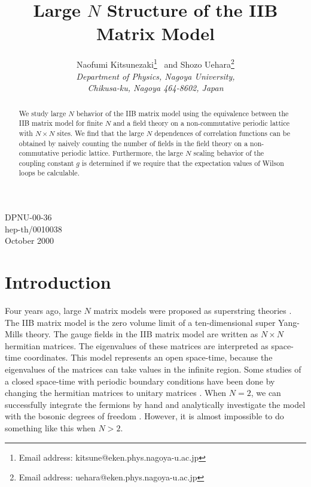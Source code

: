 \documentclass[12pt,a4paper]{article}
\begin{document}
\title{Large $N$ Structure of the IIB Matrix Model}
\author{{\sc Naofumi Kitsunezaki}\thanks{Email address:
kitsune@eken.phys.nagoya-u.ac.jp} ~and
{\sc Shozo Uehara}\thanks{Email address:
uehara@eken.phys.nagoya-u.ac.jp}\vspace{4mm}\\
{\it Department of Physics, Nagoya University,}\\
{\it Chikusa-ku, Nagoya 464-8602, Japan}}
\date{}
\maketitle
\vspace{-70mm}
\begin{flushright}
	DPNU-00-36\\
	hep-th/0010038\\
	October 2000
\end{flushright}
\vspace{50mm}

\begin{abstract}
We study large $N$ behavior of the IIB matrix model using the
equivalence between the IIB matrix model for finite $N$ and a field
theory on a non-commutative periodic lattice with $N\times N$ sites.
We find that the large $N$ dependences of correlation functions can be
obtained by naively counting the number of fields in the field
theory on a non-commutative periodic lattice.
Furthermore, the large $N$ scaling behavior of the coupling constant
$g$ is determined if we require that the expectation values of
Wilson loops be calculable.
\end{abstract}

\section{Introduction}
Four years ago, large $N$ matrix models were proposed as
superstring theories \cite{BFSS,IKKT,FKKT,AIKKT}.
The IIB matrix model \cite{IKKT} is the zero volume limit \cite{EK} of
a ten-dimensional super Yang-Mills theory.
The gauge fields in the IIB matrix model are written as $N\times N$
hermitian matrices.
The eigenvalues of these matrices are interpreted as space-time
coordinates. This model represents an open space-time, because the
eigenvalues of the matrices can take values in the infinite region.
Some studies of a closed space-time with periodic boundary conditions
have been done by changing the hermitian matrices to unitary matrices
\cite{KN}. When $N=2$, we can successfully integrate the fermions by
hand and analytically investigate the model with the bosonic degrees
of freedom \cite{TsuSu}. However, it is almost impossible to do
something like this when $N>2$.
\end{document}
